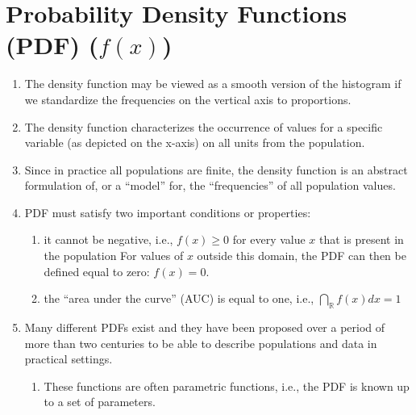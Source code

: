 \section{Probability Density Functions (PDF) ($f(x)$)}

\begin{enumerate}
    \item The density function may be viewed as a smooth version of the histogram if we standardize the frequencies on the vertical axis to proportions. 
    \hfill \cite{statistics/book/Statistics-for-Data-Scientists/Maurits-Kaptein}

    \item The density function characterizes the occurrence of values for a specific variable (as depicted on the x-axis) on all units from the population. 
    \hfill \cite{statistics/book/Statistics-for-Data-Scientists/Maurits-Kaptein}

    \item Since in practice all populations are finite, the density function is an abstract formulation of, or a “model” for, the “frequencies” of all population values.
    \hfill \cite{statistics/book/Statistics-for-Data-Scientists/Maurits-Kaptein}

    \item PDF must satisfy two important conditions or properties:
    \hfill \cite{statistics/book/Statistics-for-Data-Scientists/Maurits-Kaptein}
    \begin{enumerate}
        \item  it cannot be negative, i.e., $f (x) \geq 0$ for every value $x$ that is present in the population
        For values of $x$ outside this domain, the PDF can then be defined equal to zero: $f (x) = 0$.
        \hfill \cite{statistics/book/Statistics-for-Data-Scientists/Maurits-Kaptein}

        \item  the “area under the curve” (AUC) is equal to one, i.e., $\dint_{\mathbb{R}} f(x) dx = 1$
        \hfill \cite{statistics/book/Statistics-for-Data-Scientists/Maurits-Kaptein}
    \end{enumerate}

    \item Many different PDFs exist and they have been proposed over a period of more than two centuries to be able to describe populations and data in practical settings.
    \hfill \cite{statistics/book/Statistics-for-Data-Scientists/Maurits-Kaptein}
    \begin{enumerate}
        \item These functions are often parametric functions, i.e., the PDF is known up to a set of parameters.
        \hfill \cite{statistics/book/Statistics-for-Data-Scientists/Maurits-Kaptein}


\end{enumerate}
\end{enumerate}
